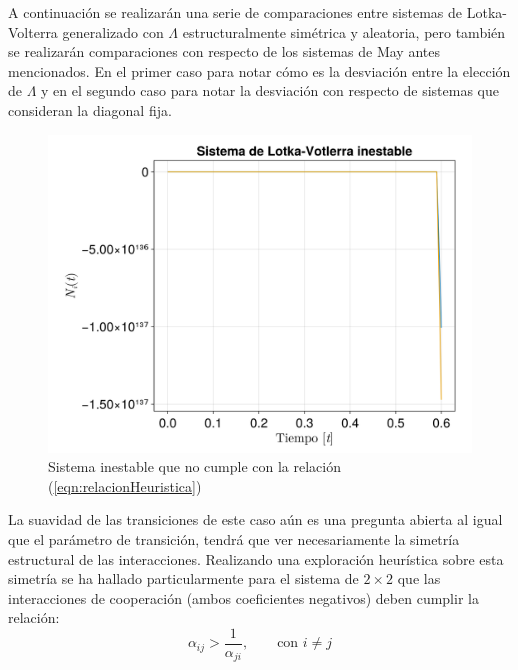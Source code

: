 A continuación se realizarán una serie de comparaciones entre sistemas de Lotka-Volterra generalizado con $\Lambda$ estructuralmente simétrica y aleatoria, pero también se realizarán comparaciones con respecto de los sistemas de May antes mencionados. En el primer caso para notar cómo es la desviación entre la elección de $\Lambda$ y en el segundo caso para notar la desviación con respecto de sistemas que consideran la diagonal fija.\\
\begin{figure} \vspace{-30pt} \begin{center}
		\includegraphics[scale=0.135]{../Imagenes/Heuristico}
	\end{center}
	\vspace{-20pt} 
	\caption{Sistema inestable que no cumple con la relación (\ref{eqn:relacionHeuristica})}
	\vspace{-10pt}
	\label{fig:Heuristico}
\end{figure}
La suavidad de las transiciones de este caso aún es una pregunta abierta al igual que el parámetro de transición, tendrá que ver necesariamente la simetría estructural de las interacciones. Realizando una exploración heurística sobre esta simetría se ha hallado particularmente para el sistema de $2\times 2$ que las interacciones de cooperación  (ambos coeficientes negativos) deben cumplir la relación:
\begin{equation}\label{eqn:relacionHeuristica}
	\alpha_{ij}>\frac{1}{\alpha_{ji}},\qquad \text{con }i\neq j
\end{equation}
